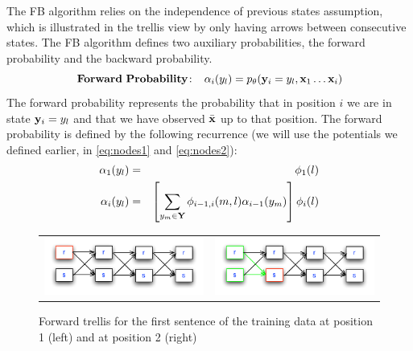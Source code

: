 The FB algorithm relies on the independence of previous states
assumption, which  
is illustrated in the trellis view by only having arrows between consecutive states. 
The FB algorithm defines two auxiliary probabilities, the forward probability and the backward probability. 
\begin{equation}
\label{eq::forward}
\mathbf{Forward \ Probability\!:}\;\;\;\;  \alpha_i({y}_l) = p_{\theta}(\mathbf{y}_i = {y}_l , \mathbf{x}_1 \ldots \mathbf{x}_i)
\end{equation}
The forward probability represents the probability that in position
$i$ we are in state $\mathbf{y}_i = {y}_l$ and that we have observed $\bar{\mathbf{x}}$
up to that position. The forward probability is defined by the
following recurrence (we will use the potentials we defined earlier, in \eqref{eq:nodes1} and \eqref{eq:nodes2}): 
\begin{eqnarray}
\alpha_1({y}_l) &=& \phi_1(l) \\
\alpha_i({y}_l) &=& \left[ \displaystyle \sum_{{y}_m \in \mathbf{Y}} \phi_{i-1,i}(m,l) \alpha_{i-1}({y}_m) \right] \phi_i(l) \label{forwardRecursion}
\end{eqnarray}

\begin{figure}
\begin{center}
\begin{tabular}{cc}

\includegraphics[scale=.5]{figs/sequences/forward1}
& \includegraphics[scale=.5]{figs/sequences/forward2}\\
\end{tabular}
\caption[Forward backward example.]{\label{fig:fb} Forward trellis for
  the first sentence of the training data at position 1 (left) and at
  position 2 (right)}

\end{center}
\end{figure}

